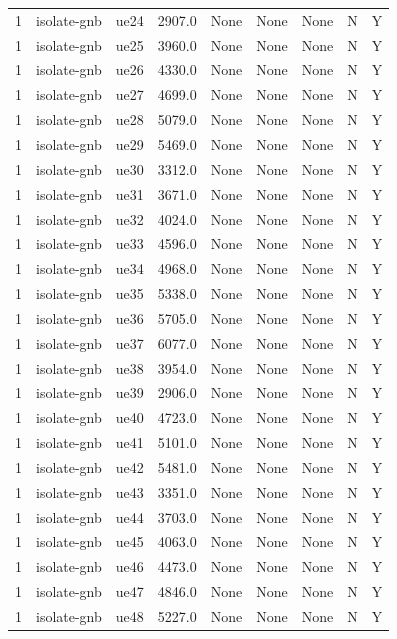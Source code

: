 \begin{table}[ht]
\begin{tabular}{|c|c|c|c|c|c|c|c|c|}
1 & isolate-gnb & ue24 & 2907.0 & None & None & None & N & Y \\
1 & isolate-gnb & ue25 & 3960.0 & None & None & None & N & Y \\
1 & isolate-gnb & ue26 & 4330.0 & None & None & None & N & Y \\
1 & isolate-gnb & ue27 & 4699.0 & None & None & None & N & Y \\
1 & isolate-gnb & ue28 & 5079.0 & None & None & None & N & Y \\
1 & isolate-gnb & ue29 & 5469.0 & None & None & None & N & Y \\
1 & isolate-gnb & ue30 & 3312.0 & None & None & None & N & Y \\
1 & isolate-gnb & ue31 & 3671.0 & None & None & None & N & Y \\
1 & isolate-gnb & ue32 & 4024.0 & None & None & None & N & Y \\
1 & isolate-gnb & ue33 & 4596.0 & None & None & None & N & Y \\
1 & isolate-gnb & ue34 & 4968.0 & None & None & None & N & Y \\
1 & isolate-gnb & ue35 & 5338.0 & None & None & None & N & Y \\
1 & isolate-gnb & ue36 & 5705.0 & None & None & None & N & Y \\
1 & isolate-gnb & ue37 & 6077.0 & None & None & None & N & Y \\
1 & isolate-gnb & ue38 & 3954.0 & None & None & None & N & Y \\
1 & isolate-gnb & ue39 & 2906.0 & None & None & None & N & Y \\
1 & isolate-gnb & ue40 & 4723.0 & None & None & None & N & Y \\
1 & isolate-gnb & ue41 & 5101.0 & None & None & None & N & Y \\
1 & isolate-gnb & ue42 & 5481.0 & None & None & None & N & Y \\
1 & isolate-gnb & ue43 & 3351.0 & None & None & None & N & Y \\
1 & isolate-gnb & ue44 & 3703.0 & None & None & None & N & Y \\
1 & isolate-gnb & ue45 & 4063.0 & None & None & None & N & Y \\
1 & isolate-gnb & ue46 & 4473.0 & None & None & None & N & Y \\
1 & isolate-gnb & ue47 & 4846.0 & None & None & None & N & Y \\
1 & isolate-gnb & ue48 & 5227.0 & None & None & None & N & Y \\

\end{tabular}
\end{table}
